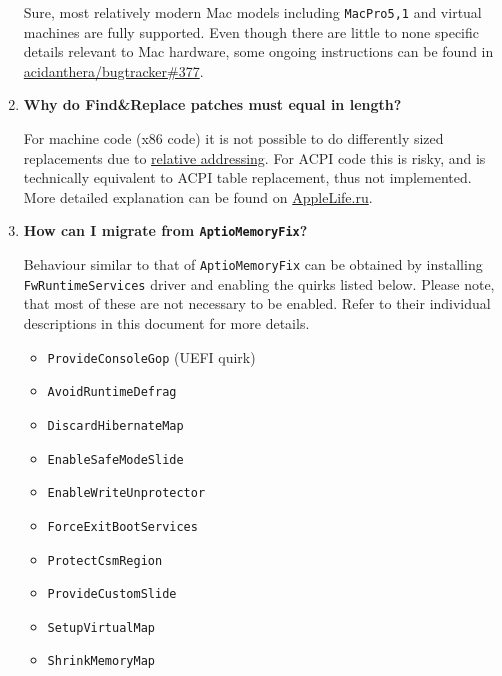 \documentclass[]{article}
\providecommand{\tightlist}{%
  \setlength{\itemsep}{0pt}\setlength{\parskip}{0pt}}
\begin{document}
\begin{enumerate}
  Sure, most relatively modern Mac models including \texttt{MacPro5,1} and virtual machines
  are fully supported. Even though there are little to none specific details relevant to
  Mac hardware, some ongoing instructions can be found in
  \href{https://github.com/acidanthera/bugtracker/issues/377}{acidanthera/bugtracker\#377}.

\item
  \textbf{Why do Find\&Replace patches must equal in length?}

  For machine code (x86 code) it is not possible to do differently sized replacements due to
  \href{https://en.wikipedia.org/w/index.php?title=Relative_addressing}{relative addressing}.
  For ACPI code this is risky, and is technically equivalent to ACPI table replacement,
  thus not implemented. More detailed explanation can be found on
  \href{https://applelife.ru/posts/819790}{AppleLife.ru}.

\item
  \textbf{How can I migrate from \texttt{AptioMemoryFix}?}

  Behaviour similar to that of \texttt{AptioMemoryFix} can be obtained by
  installing \texttt{FwRuntimeServices} driver and enabling the quirks listed below.
  Please note, that most of these are not necessary to be enabled. Refer to their
  individual descriptions in this document for more details.
  \begin{itemize}
  \tightlist
  \item \texttt{ProvideConsoleGop} (UEFI quirk)
  \item \texttt{AvoidRuntimeDefrag}
  \item \texttt{DiscardHibernateMap}
  \item \texttt{EnableSafeModeSlide}
  \item \texttt{EnableWriteUnprotector}
  \item \texttt{ForceExitBootServices}
  \item \texttt{ProtectCsmRegion}
  \item \texttt{ProvideCustomSlide}
  \item \texttt{SetupVirtualMap}
  \item \texttt{ShrinkMemoryMap}
  \end{itemize}

\end{enumerate}
\end{document}
